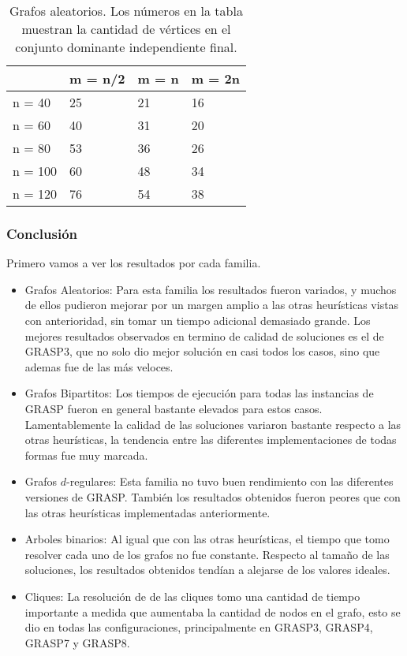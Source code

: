\begin{table}[H]
\centering
\label{my-label}
\begin{tabular}{|l|lll|}
\hline
        & \multicolumn{1}{l|}{m = n/2} & \multicolumn{1}{l|}{m = n} & m = 2n \\ \hline
n = 40  & 25                           & 21                         & 16     \\ \cline{1-1}
n = 60  & 40                           & 31                         & 20     \\ \cline{1-1}
n = 80  & 53                           & 36                         & 26     \\ \cline{1-1}
n = 100 & 60                           & 48                         & 34     \\ \cline{1-1}
n = 120 & 76                           & 54                         & 38     \\ \hline
\end{tabular}
\caption{Grafos aleatorios. Los números en la tabla muestran la cantidad de vértices en el conjunto dominante independiente final.}
\end{table}

\subsubsection{Conclusión}

Primero vamos a ver los resultados por cada familia.

\begin{itemize}
	\item Grafos Aleatorios: Para esta familia los resultados fueron variados, y muchos de ellos pudieron mejorar por un margen amplio a las otras heurísticas vistas con anterioridad, sin tomar un tiempo adicional demasiado grande. Los mejores resultados observados en termino de calidad de soluciones es el de GRASP3, que no solo dio mejor solución en casi todos los casos, sino que ademas fue de las más veloces.	
	\item Grafos Bipartitos: Los tiempos de ejecución para todas las instancias de GRASP fueron en general bastante elevados para estos casos. Lamentablemente la calidad de las soluciones variaron bastante respecto a las otras heurísticas, la tendencia entre las diferentes implementaciones de todas formas fue muy marcada.
	\item Grafos $d$-regulares: Esta familia no tuvo buen rendimiento con las diferentes versiones de GRASP. También los resultados obtenidos fueron peores que con las otras heurísticas implementadas anteriormente.
	\item Arboles binarios: Al igual que con las otras heurísticas, el tiempo que tomo resolver cada uno de los grafos no fue constante. Respecto al tamaño de las soluciones, los resultados obtenidos tendían a alejarse de los valores ideales.
	\item Cliques: La resolución de de las cliques tomo una cantidad de tiempo importante a medida que aumentaba la cantidad de nodos en el grafo, esto se dio en todas las configuraciones, principalmente en GRASP3, GRASP4, GRASP7 y GRASP8.
\end{itemize}

